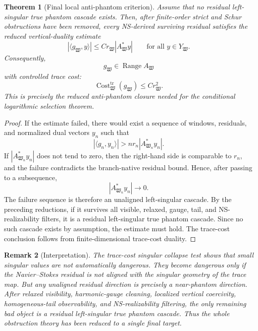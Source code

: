 \documentclass[11pt]{article}
\numberwithin{equation}{section}
\newtheorem{theorem}{Theorem}[section]
\newtheorem{remark}[theorem]{Remark}
\begin{document}
\begin{theorem}[Final local anti-phantom criterion]
Assume that no residual left-singular true phantom cascade exists. Then, after finite-order strict and Schur obstructions have been removed, every NS-derived surviving residual satisfies the reduced vertical-duality estimate
\begin{equation}
|\langle g_{\mathfrak W},y\rangle|
\le
C r_{\mathfrak W}|A_{\mathfrak W}^*y|
\qquad
\text{for all }y\in Y_{\mathfrak W}.
\label{eq:tag-10-244}
\end{equation}
Consequently,
\[
g_{\mathfrak W}\in\operatorname{Range}A_{\mathfrak W}
\]
with controlled trace cost:
\begin{equation}
\operatorname{Cost}^{\operatorname{tr}}_{\mathfrak W}(g_{\mathfrak W})
\le
C r_{\mathfrak W}^2.
\label{eq:tag-10-245}
\end{equation}
This is precisely the reduced anti-phantom closure needed for the conditional logarithmic selection theorem.
\end{theorem}

\begin{proof}
If the estimate failed, there would exist a sequence of windows, residuals, and normalized dual vectors \(y_n\) such that
\[
|\langle g_n,y_n\rangle|
 >
n r_n|A_{\mathfrak W_n}^*y_n|.
\]
If \(|A_{\mathfrak W_n}^*y_n|\) does not tend to zero, then the right-hand side is comparable to \(r_n\), and the failure contradicts the branch-native residual bound. Hence, after passing to a subsequence,
\[
|A_{\mathfrak W_n}^*y_n|\to0.
\]
The failure sequence is therefore an unaligned left-singular cascade. By the preceding reductions, if it survives all visible, relaxed, gauge, tail, and NS-realizability filters, it is a residual left-singular true phantom cascade. Since no such cascade exists by assumption, the estimate must hold. The trace-cost conclusion follows from finite-dimensional trace-cost duality.
\end{proof}

\begin{remark}[Interpretation]
The trace-cost singular collapse test shows that small singular values are not automatically dangerous. They become dangerous only if the Navier--Stokes residual is not aligned with the singular geometry of the trace map. But any unaligned residual direction is precisely a near-phantom direction. After relaxed visibility, harmonic-gauge cleaning, localized vertical coercivity, homogeneous-tail observability, and NS-realizability filtering, the only remaining bad object is a residual left-singular true phantom cascade. Thus the whole obstruction theory has been reduced to a single final target.
\end{remark}
\end{document}
